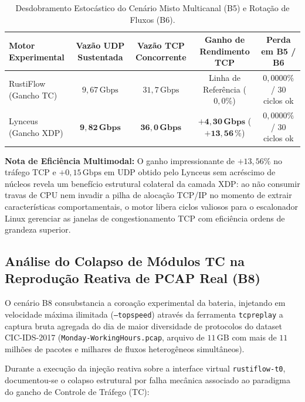 \documentclass[11pt,a4paper]{article}
\begin{document}
\begin{table}[H]
\centering
\begin{threeparttable}
\begin{tabular}{lcccc}
\toprule
\textbf{Motor Experimental} & \textbf{Vazão UDP Sustentada} & \textbf{Vazão TCP Concorrente} & \textbf{Ganho de Rendimento TCP} & \textbf{Perda em B5 / B6} \\
\midrule
RustiFlow (Gancho TC) & $9,67\,\text{Gbps}$ & $31,7\,\text{Gbps}$ & Linha de Referência ($0,0\%$) & $0,0000\%$ / $30$ ciclos ok \\
Lynceus (Gancho XDP) & $\mathbf{9,82\,\text{Gbps}}$ & $\mathbf{36,0\,\text{Gbps}}$ & $\mathbf{+4,30\,\text{Gbps}}$ ($\mathbf{+13,56\,\%}$) & $0,0000\%$ / $30$ ciclos ok \\
\bottomrule
\end{tabular}
\begin{tablenotes}
\small
\item[-] \textbf{Nota de Eficiência Multimodal:} O ganho impressionante de $+13,56\%$ no tráfego TCP e $+0,15\,\text{Gbps}$ em UDP obtido pelo Lynceus sem acréscimo de núcleos revela um benefício estrutural colateral da camada XDP: ao não consumir travas de CPU nem invadir a pilha de alocação TCP/IP no momento de extrair características comportamentais, o motor libera ciclos valiosos para o escalonador Linux gerenciar as janelas de congestionamento TCP com eficiência ordens de grandeza superior.
\end{tablenotes}
\end{threeparttable}
\caption{Desdobramento Estocástico do Cenário Misto Multicanal (B5) e Rotação de Fluxos (B6).}
\end{table}

\subsection{Análise do Colapso de Módulos TC na Reprodução Reativa de PCAP Real (B8)}
O cenário B8 consubstancia a coroação experimental da bateria, injetando em velocidade máxima ilimitada (\texttt{--topspeed}) através da ferramenta \texttt{tcpreplay} a captura bruta agregada do dia de maior diversidade de protocolos do dataset CIC-IDS-2017 (\texttt{Monday-WorkingHours.pcap}, arquivo de $11\,\text{GB}$ com mais de $11$ milhões de pacotes e milhares de fluxos heterogêneos simultâneos).

Durante a execução da injeção reativa sobre a interface virtual \texttt{rustiflow-t0}, documentou-se o colapso estrutural por falha mecânica associado ao paradigma do gancho de Controle de Tráfego (TC):
\end{document}
